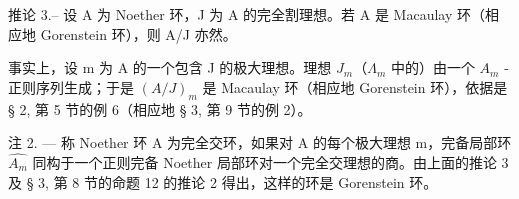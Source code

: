 推论 3.-- 设 A 为 Noether 环，J 为 A 的完全割理想。若 A 是 Macaulay 环（相应地 Gorenstein 环），则 A/J 亦然。

事实上，设 m 为 A 的一个包含 J 的极大理想。理想 \(J_{m}\)（\(\Lambda_{m}\) 中的）由一个 \(A_{m}\) -正则序列生成；于是 \((A/J)_{m}\) 是 Macaulay 环（相应地 Gorenstein 环），依据是 § 2, 第 5 节的例 6（相应地 § 3, 第 9 节的例 2）。

注 2. — 称 Noether 环 A 为完全交环，如果对 A 的每个极大理想 m，完备局部环 \(\widehat{A_{m}}\) 同构于一个正则完备 Noether 局部环对一个完全交理想的商。由上面的推论 3 及 § 3, 第 8 节的命题 12 的推论 2 得出，这样的环是 Gorenstein 环。

